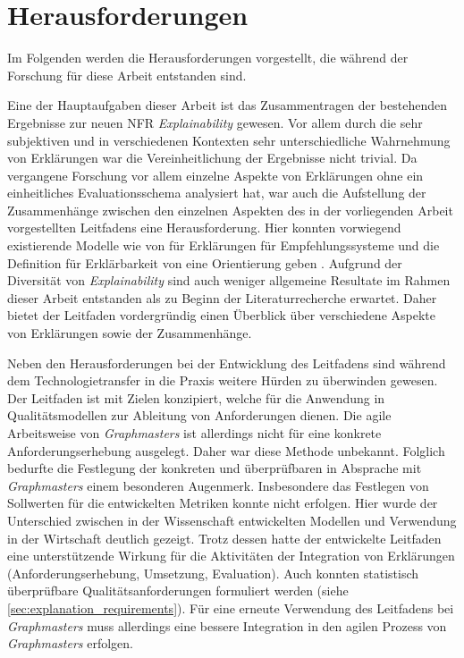 \section{Herausforderungen}

Im Folgenden werden die Herausforderungen vorgestellt, die während der Forschung für diese Arbeit entstanden sind.

Eine der Hauptaufgaben dieser Arbeit ist das Zusammentragen der bestehenden Ergebnisse zur neuen NFR \textit{Explainability} gewesen. Vor allem durch die sehr subjektiven und in verschiedenen Kontexten sehr unterschiedliche Wahrnehmung von Erklärungen war die Vereinheitlichung der Ergebnisse nicht trivial. Da vergangene Forschung vor allem einzelne Aspekte von Erklärungen ohne ein einheitliches Evaluationsschema analysiert hat, war auch die Aufstellung der Zusammenhänge zwischen den einzelnen Aspekten des in der vorliegenden Arbeit vorgestellten Leitfadens eine Herausforderung. Hier konnten vorwiegend existierende Modelle wie von \citeauthor{nunes_systematic_2017} für Erklärungen für Empfehlungssysteme und die Definition für Erklärbarkeit von \citeauthor{chazette_knowledge_nodate} eine Orientierung geben \cite{nunes_systematic_2017, chazette_knowledge_nodate}. Aufgrund der Diversität von \textit{Explainability} sind auch weniger allgemeine Resultate im Rahmen dieser Arbeit entstanden als zu Beginn der Literaturrecherche erwartet. Daher bietet der Leitfaden vordergründig einen Überblick über verschiedene Aspekte von Erklärungen sowie der Zusammenhänge.

Neben den Herausforderungen bei der Entwicklung des Leitfadens sind während dem Technologietransfer in die Praxis weitere Hürden zu überwinden gewesen. Der Leitfaden ist mit Zielen konzipiert, welche für die Anwendung in Qualitätsmodellen zur Ableitung von Anforderungen dienen. Die agile Arbeitsweise von \textit{Graphmasters} ist allerdings nicht für eine konkrete Anforderungserhebung ausgelegt. Daher war diese Methode unbekannt. Folglich bedurfte die Festlegung der konkreten und überprüfbaren in Absprache mit \textit{Graphmasters} einem besonderen Augenmerk. Insbesondere das Festlegen von Sollwerten für die entwickelten Metriken konnte nicht erfolgen. Hier wurde der Unterschied zwischen in der Wissenschaft entwickelten Modellen und Verwendung in der Wirtschaft deutlich gezeigt. Trotz dessen hatte der entwickelte Leitfaden eine unterstützende Wirkung für die Aktivitäten der Integration von Erklärungen (Anforderungserhebung, Umsetzung, Evaluation). Auch konnten statistisch überprüfbare Qualitätsanforderungen formuliert werden (siehe \autoref{sec:explanation_requirements}). Für eine erneute Verwendung des Leitfadens bei \textit{Graphmasters} muss allerdings eine bessere Integration in den agilen Prozess von \textit{Graphmasters} erfolgen.